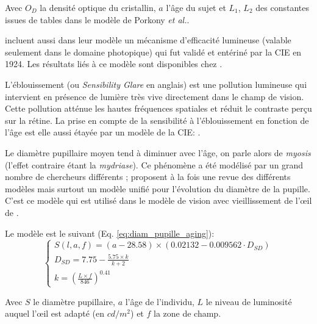 	\par Avec $O_D$ la densité optique du cristallin, $a$ l'âge du sujet et $L_1$, $L_2$ des constantes issues de tables dans le modèle de Porkony \textit{et al.}.
	
	
	\par \citep{mantiuk_human_2015} incluent aussi dans leur modèle un mécanisme d'efficacité lumineuse (valable seulement dans le domaine photopique) qui fut validé et entériné par la CIE en 1924. Les résultats liés à ce modèle sont disponibles chez \citep{sagawa_spectral_2001}.
	
	\par L'éblouissement (ou \textit{Sensibility Glare} en anglais) est une pollution lumineuse qui intervient en présence de lumière très vive directement dans le champ de vision. Cette pollution atténue les hautes fréquences spatiales et réduit le contraste perçu sur la rétine. La prise en compte de la sensibilité à l'éblouissement en fonction de l'âge est elle aussi étayée par un modèle de la CIE: \citep{vos_cie_1999}.
	
	\par Le diamètre pupillaire moyen tend à diminuer avec l'âge, on parle alors de \textit{myosis} (l'effet contraire étant la \textit{mydriase}). Ce phénomène a été modélisé par un grand nombre de chercheurs différents ; \citep{watson_unified_2012} proposent à la fois une revue des différents modèles mais surtout un modèle unifié pour l'évolution du diamètre de la pupille. C'est ce modèle qui est utilisé dans le modèle de vision avec vieillissement de l'œil de \citep{mantiuk_human_2015}.
	
	\par Le modèle est le suivant (Eq. \ref{eq:diam_pupille_aging}):
	\begin{equation}
		\begin{cases}
		S(l,a,f) = (a-28.58) \times (0.02132-0.009562 \cdot D_{SD})\\
		D_{SD} = 7.75 - \frac{5.75 \times k}{k+2}\\
		k = \left( \frac{L \times f}{846} \right)^{0.41}
		\end{cases}
		\label{eq:diam_pupille_aging}
	\end{equation}
	
	\par Avec $S$ le diamètre pupillaire, $a$ l'âge de l'individu, $L$ le niveau de luminosité auquel l'œil est adapté (en $cd/m^2$) et $f$ la zone de champ.
	
